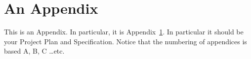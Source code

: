 \chapter{An Appendix}\label{app:projectplan}
This is an Appendix. In particular, it is Appendix~\ref{app:projectplan}. In particular
it should be your Project Plan and Specification. Notice that the numbering of
appendices is based A, B, C \ldots etc.
